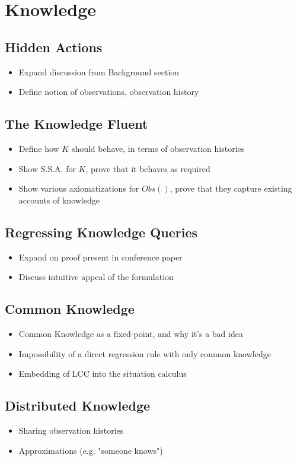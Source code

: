 \chapter{Knowledge}\label{ch:knowledge}

\section{Hidden Actions}

\begin{itemize}
\item Expand discussion from Background section
\item Define notion of observations, observation history
\end{itemize}

\section{The Knowledge Fluent}

\begin{itemize}
\item Define how $K$ should behave, in terms of observation histories
\item Show S.S.A. for $K$, prove that it behaves as required
\item Show various axiomatizations for $Obs()$, prove that they capture
existing accounts of knowledge
\end{itemize}

\section{Regressing Knowledge Queries}

\begin{itemize}
\item Expand on proof present in conference paper
\item Discuss intuitive appeal of the formulation
\end{itemize}

\section{Common Knowledge}

\begin{itemize}
\item Common Knowledge as a fixed-point, and why it's a bad idea
\item Impossibility of a direct regression rule with only common knowledge
\item Embedding of LCC into the situation calculus
\end{itemize}

\section{Distributed Knowledge}

\begin{itemize}
\item Sharing observation histories
\item Approximations (e.g. "someone knows")
\end{itemize}


